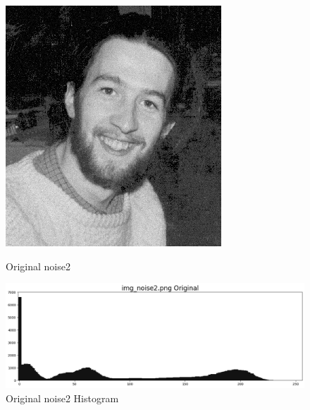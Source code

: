 \documentclass[12pt,a4paper]{report}
\begin{document}
\begin{figure}[!htb]
  \centering
  \includegraphics[width=1\linewidth]{test_img/noise2.png}
  \caption{Original noise2}
  \includegraphics[width=1\linewidth]{result_img/noise2_his.png}
  \caption{Original noise2 Histogram}
\end{figure}
\end{document}
